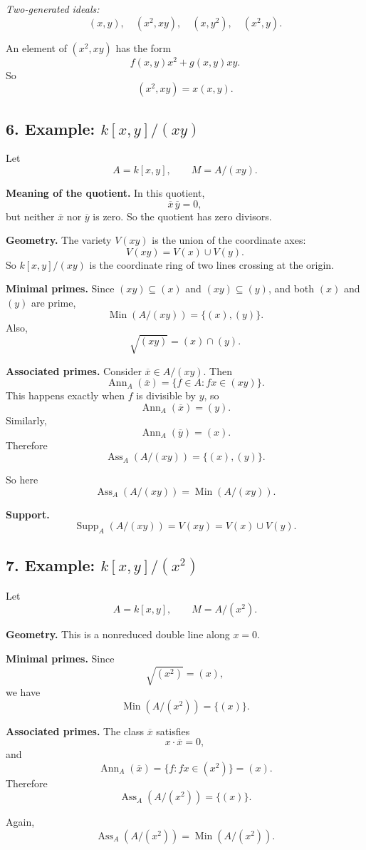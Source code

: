 \documentclass[12pt,a4paper]{article}
\theoremstyle{notespace}
\DeclareMathOperator{\Ass}{Ass}
\DeclareMathOperator{\Ann}{Ann}
\DeclareMathOperator{\Supp}{Supp}
\DeclareMathOperator{\Min}{Min}
\begin{document}
\emph{Two-generated ideals:}
\[
(x,y),\quad (x^2,xy),\quad (x,y^2),\quad (x^2,y).
\]

An element of \((x^2,xy)\) has the form
\[
f(x,y)x^2+g(x,y)xy.
\]
So
\[
(x^2,xy)=x(x,y).
\]

\subsection*{6. Example: \(k[x,y]/(xy)\)}

Let
\[
A=k[x,y],\qquad M=A/(xy).
\]

\textbf{Meaning of the quotient.}
In this quotient,
\[
\overline x\,\overline y=0,
\]
but neither \(\overline x\) nor \(\overline y\) is zero.
So the quotient has zero divisors.

\textbf{Geometry.}
The variety \(V(xy)\) is the union of the coordinate axes:
\[
V(xy)=V(x)\cup V(y).
\]
So \(k[x,y]/(xy)\) is the coordinate ring of two lines crossing at the origin.

\textbf{Minimal primes.}
Since \((xy)\subseteq (x)\) and \((xy)\subseteq (y)\), and both \((x)\) and \((y)\) are prime,
\[
\Min(A/(xy))=\{(x),(y)\}.
\]
Also,
\[
\sqrt{(xy)}=(x)\cap (y).
\]

\textbf{Associated primes.}
Consider \(\overline x\in A/(xy)\). Then
\[
\Ann_A(\overline x)=\{f\in A:fx\in (xy)\}.
\]
This happens exactly when \(f\) is divisible by \(y\), so
\[
\Ann_A(\overline x)=(y).
\]
Similarly,
\[
\Ann_A(\overline y)=(x).
\]
Therefore
\[
\Ass_A(A/(xy))=\{(x),(y)\}.
\]

So here
\[
\Ass_A(A/(xy))=\Min(A/(xy)).
\]

\textbf{Support.}
\[
\Supp_A(A/(xy))=V(xy)=V(x)\cup V(y).
\]

\subsection*{7. Example: \(k[x,y]/(x^2)\)}

Let
\[
A=k[x,y],\qquad M=A/(x^2).
\]

\textbf{Geometry.}
This is a nonreduced double line along \(x=0\).

\textbf{Minimal primes.}
Since
\[
\sqrt{(x^2)}=(x),
\]
we have
\[
\Min(A/(x^2))=\{(x)\}.
\]

\textbf{Associated primes.}
The class \(\overline x\) satisfies
\[
x\cdot \overline x=0,
\]
and
\[
\Ann_A(\overline x)=\{f:fx\in (x^2)\}=(x).
\]
Therefore
\[
\Ass_A(A/(x^2))=\{(x)\}.
\]

Again,
\[
\Ass_A(A/(x^2))=\Min(A/(x^2)).
\]
\end{document}
